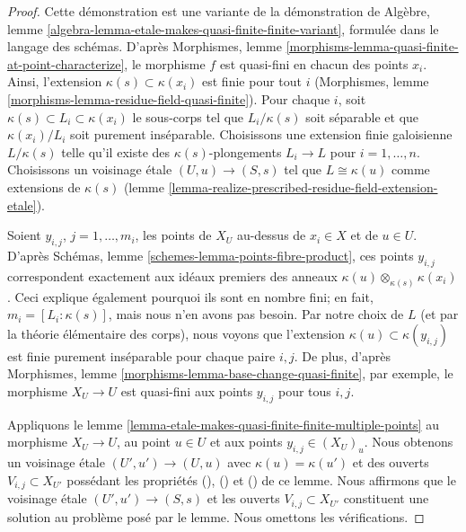 \begin{proof}
Cette démonstration est une variante de la démonstration de
Algèbre, lemme \ref{algebra-lemma-etale-makes-quasi-finite-finite-variant},
formulée dans le langage des schémas.
D'après Morphismes, lemme \ref{morphisms-lemma-quasi-finite-at-point-characterize},
le morphisme $f$ est quasi-fini en chacun des points $x_i$.
Ainsi, l'extension $\kappa(s) \subset \kappa(x_i)$ est finie pour tout $i$
(Morphismes, lemme \ref{morphisms-lemma-residue-field-quasi-finite}).
Pour chaque $i$, soit $\kappa(s) \subset L_i \subset \kappa(x_i)$
le sous-corps tel que $L_i/\kappa(s)$ soit séparable et que
$\kappa(x_i)/L_i$ soit purement inséparable. Choisissons une extension finie
galoisienne $L/\kappa(s)$ telle qu'il existe des
$\kappa(s)$-plongements $L_i \to L$ pour $i = 1, \ldots, n$.
Choisissons un voisinage \'etale $(U, u) \to (S, s)$ tel que
$L \cong \kappa(u)$ comme extensions de $\kappa(s)$
(lemme \ref{lemma-realize-prescribed-residue-field-extension-etale}).

\medskip\noindent
Soient $y_{i, j}$, $j = 1, \ldots, m_i$, les points de $X_U$
au-dessus de $x_i \in X$ et de $u \in U$. D'après
Schémas, lemme \ref{schemes-lemma-points-fibre-product},
ces points $y_{i, j}$ correspondent exactement aux idéaux premiers des anneaux
$\kappa(u) \otimes_{\kappa(s)} \kappa(x_i)$. Ceci explique également
pourquoi ils sont en nombre fini; en fait,
$m_i = [L_i : \kappa(s)]$, mais nous n'en avons pas besoin.
Par notre choix de
$L$ (et par la théorie élémentaire des corps),
nous voyons que l'extension $\kappa(u) \subset \kappa(y_{i, j})$ est
finie purement inséparable pour chaque paire $i, j$.
De plus, d'après Morphismes, lemme \ref{morphisms-lemma-base-change-quasi-finite},
par exemple, le morphisme
$X_U \to U$ est quasi-fini aux points $y_{i, j}$ pour
tous $i, j$.

\medskip\noindent
Appliquons le lemme \ref{lemma-etale-makes-quasi-finite-finite-multiple-points}
au morphisme $X_U \to U$, au point $u \in U$
et aux points $y_{i, j} \in (X_U)_u$. Nous obtenons un voisinage \'etale
$(U', u') \to (U, u)$ avec $\kappa(u) = \kappa(u')$ et des
ouverts $V_{i, j} \subset X_{U'}$ possédant les propriétés
(), () et ()
de ce lemme. Nous affirmons que le voisinage \'etale
$(U', u') \to (S, s)$ et les ouverts $V_{i, j} \subset X_{U'}$
constituent une solution au problème posé par le lemme.
Nous omettons les vérifications.
\end{proof}

